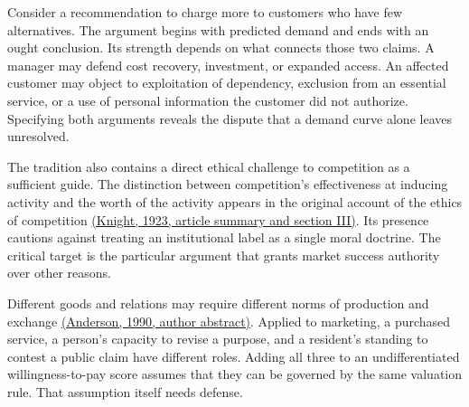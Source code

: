 \noindent \noindent Consider a recommendation to charge more to customers who have
few alternatives. The argument begins with predicted demand and ends
with an ought conclusion. Its strength depends on what connects those
two claims. A manager may defend cost recovery, investment, or expanded
access. An affected customer may object to exploitation of dependency,
exclusion from an essential service, or a use of personal information
the customer did not authorize. Specifying both arguments reveals the
dispute that a demand curve alone leaves unresolved.

The tradition also contains a direct ethical challenge to competition as
a sufficient guide. The distinction between competition's effectiveness
at inducing activity and the worth of the activity appears in the
original account of the ethics of competition
\href{https://doi.org/10.2307/1884053}{(Knight, 1923, article summary
and section III)}. Its presence cautions against treating an
institutional label as a single moral doctrine. The critical target is
the particular argument that grants market success authority over other
reasons.

Different goods and relations may require different norms of production
and exchange
\href{https://websites.umich.edu/eandersn/abstracts.htm}{(Anderson,
1990, author abstract)}. Applied to marketing, a purchased service, a
person's capacity to revise a purpose, and a resident's standing to
contest a public claim have different roles. Adding all three to an
undifferentiated willingness-to-pay score assumes that they can be
governed by the same valuation rule. That assumption itself needs
defense.

